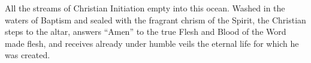 All the streams of Christian Initiation empty into this ocean. Washed in the waters of Baptism and sealed with the fragrant chrism of the Spirit, the Christian steps to the altar, answers ``Amen'' to the true Flesh and Blood of the Word made flesh, and receives already under humble veils the eternal life for which he was created.
